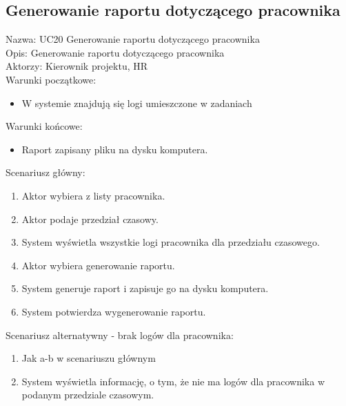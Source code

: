 \subsection{Generowanie raportu dotyczącego pracownika}
\begin{adjustwidth}{5em}{0pt}
Nazwa: UC20 Generowanie raportu dotyczącego pracownika \\
Opis: Generowanie raportu dotyczącego pracownika \\
Aktorzy: Kierownik projektu, HR \\
Warunki początkowe:
\begin{itemize}
\item W systemie znajdują się logi umieszczone w zadaniach
\end{itemize}
Warunki końcowe:
\begin{itemize}
\item Raport zapisany pliku na dysku komputera.
\end{itemize}
Scenariusz główny:
\begin{enumerate}
\item Aktor wybiera z listy pracownika.
\item Aktor podaje przedział czasowy.
\item System wyświetla wszystkie logi pracownika dla przedziału czasowego.
\item Aktor wybiera generowanie raportu.
\item System generuje raport i zapisuje go na dysku komputera.
\item System potwierdza wygenerowanie raportu.
\end{enumerate}
Scenariusz alternatywny - brak logów dla pracownika: 
\begin{enumerate}
\item Jak a-b w scenariuszu głównym
\item System wyświetla informację, o tym, że nie ma logów dla pracownika w podanym przedziale czasowym.
\end{enumerate}

\end{adjustwidth}

